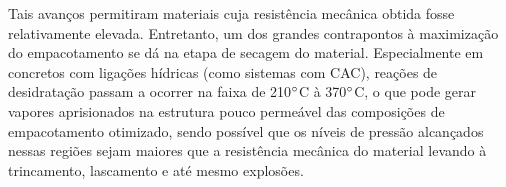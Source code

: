     Tais avanços permitiram materiais cuja resistência mecânica obtida fosse relativamente elevada. Entretanto, um dos grandes contrapontos à maximização do empacotamento se dá na etapa de secagem do material. Especialmente em concretos com ligações hídricas (como sistemas com CAC), reações de desidratação passam a ocorrer na faixa de 210$\degree$C à 370$\degree$C, o que pode gerar vapores aprisionados na estrutura pouco permeável das composições de empacotamento otimizado, sendo possível que os níveis de pressão alcançados nessas regiões sejam maiores que a resistência mecânica do material levando à trincamento, lascamento e até mesmo explosões.
 


